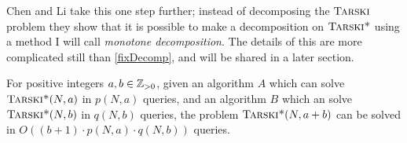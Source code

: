 Chen and Li take this one step further; instead of decomposing the $\textsc{Tarski}$ problem
they show that it is possible to make a decomposition on $\textsc{Tarski*}$ using a method
I will call \emph{monotone decomposition}. The details
of this are more complicated still than \cref{fixDecomp}, and will be shared in a later
section.
\begin{theorem}
  For positive integers $a, b \in \mathbb{Z}_{> 0}$, given an algorithm $A$
  which can solve $\textsc{Tarski*}(N, a)$ in $p(N, a)$ queries, and an algorithm $B$
  which an solve $\textsc{Tarski*}(N, b)$ in $q(N, b)$ queries, the problem $\textsc{Tarski*}(N, a + b)$
  can be solved in $O((b + 1) \cdot p(N, a) \cdot q(N, b))$ queries.
\end{theorem}

